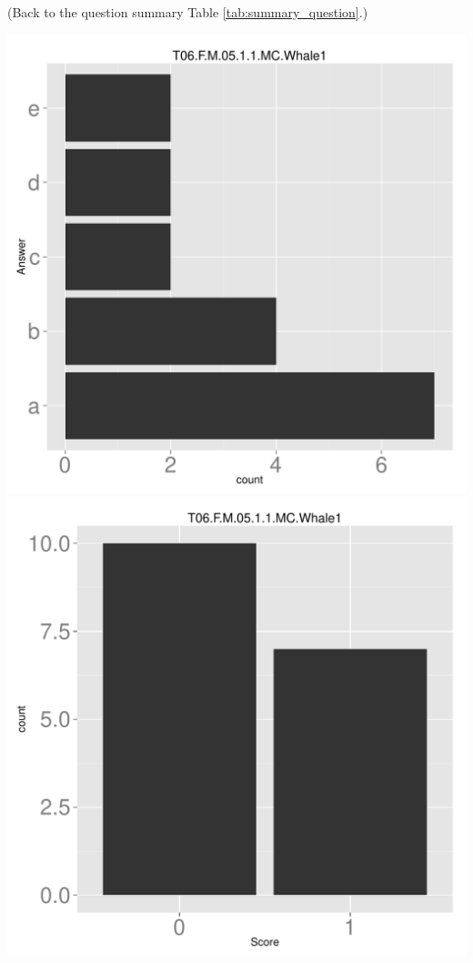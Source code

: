\documentclass[12pt,nohyper]{tufte-handout}\usepackage[]{graphicx}\usepackage[]{color}
\begin{document}
 (Back to the question summary Table \ref{tab:summary_question}.)

\begin{center} \includegraphics[width=.45\linewidth]{Topic06_48_answer} \includegraphics[width=.45\linewidth]{Topic06_48_score} \end{center} 
\end{document}
